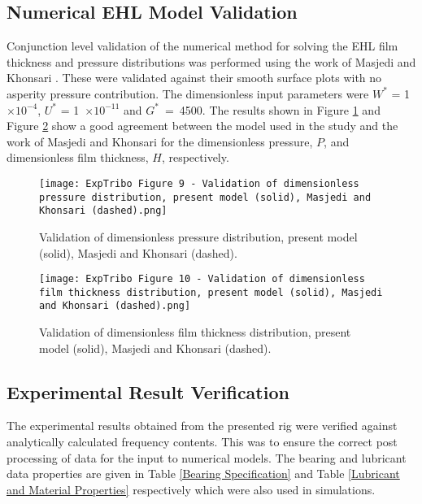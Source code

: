 \subsection{Numerical EHL Model Validation}
Conjunction level validation of the numerical method for solving the EHL film thickness and pressure distributions was performed using the work of Masjedi and Khonsari \cite{Masjedi2012}. These were validated against their smooth surface plots with no asperity pressure contribution. The dimensionless input parameters were $W^*$ = 1~$\times 10^{-4}$, $U^*$ = 1~$\times 10^{-11}$ and $G^*$~=~4500. The results shown in Figure \ref{EHL Pressure Validation Masjedi Khonsari} and Figure \ref{EHL Film Validation Masjedi Khonsari} show a good agreement between the model used in the study and the work of Masjedi and Khonsari for the dimensionless pressure, $P$, and dimensionless film thickness, $H$, respectively.

\begin{figure}
	\centering
	\texttt{[image: ExpTribo Figure 9 - Validation of dimensionless pressure distribution, present model (solid), Masjedi and Khonsari (dashed).png]}
	\caption{Validation of dimensionless pressure distribution, present model (solid), Masjedi and Khonsari (dashed).}
	\label{EHL Pressure Validation Masjedi Khonsari}
\end{figure}

\begin{figure}
	\centering
	\texttt{[image: ExpTribo Figure 10 - Validation of dimensionless film thickness distribution, present model (solid), Masjedi and Khonsari (dashed).png]}
	\caption{Validation of dimensionless film thickness distribution, present model (solid), Masjedi and Khonsari (dashed).}
	\label{EHL Film Validation Masjedi Khonsari}
\end{figure}

\subsection{Experimental Result Verification}
The experimental results obtained from the presented rig were verified against analytically calculated frequency contents. This was to ensure the correct post processing of data for the input to numerical models. The bearing and lubricant data properties are given in Table \ref{Bearing Specification} and Table \ref{Lubricant and Material Properties} respectively which were also used in simulations.

